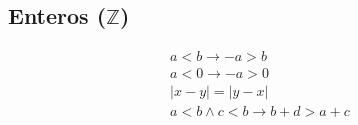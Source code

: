 \subsection{Enteros ($\mathbb{Z}$)}
\begin{gather*} 
a < b \rightarrow -a > b\\
a < 0 \rightarrow -a > 0\\
|x - y| = |y - x|\\
a < b \land c < b \rightarrow b + d > a + c\\
\end{gather*}